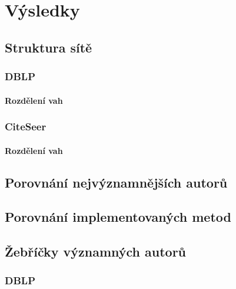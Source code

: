 \documentclass[12pt,titlepage]{report}
\begin{document}
\chapter{Výsledky}
\section{Struktura sítě}
\subsection{DBLP}
\subsubsection{Rozdělení vah}
\subsection{CiteSeer}
\subsubsection{Rozdělení vah}

\section{Porovnání nejvýznamnějších autorů}
\section{Porovnání implementovaných metod}

\section{Žebříčky významných autorů}
\subsection{DBLP}
\end{document}
